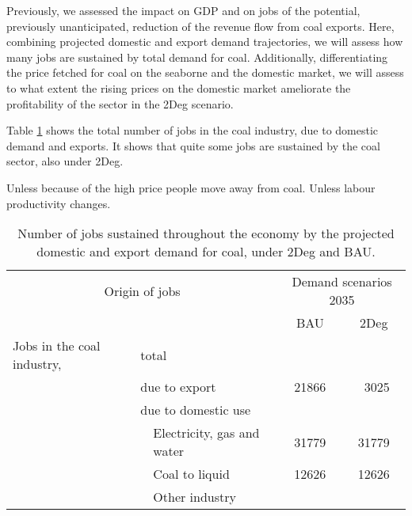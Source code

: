 \documentclass[12pt,english]{article}
\begin{document}
Previously, we assessed the impact on GDP and on jobs of the potential, previously unanticipated, reduction of the revenue flow from coal exports. Here, combining projected domestic and export demand trajectories, we will assess how many jobs are sustained by total demand for coal. Additionally, differentiating the price fetched for coal on the seaborne and the domestic market, we will assess to what extent the rising prices on the domestic market ameliorate the profitability of the sector in the 2Deg scenario. 

Table \ref{coalExport_BAUvs2Deg_2035} shows the total number of jobs in the coal industry, due to domestic demand and exports. It shows that quite some jobs are sustained by the coal sector, also under 2Deg. 

Unless because of the high price people move away from coal. Unless labour productivity changes.


\begin{table}[ht]
	\centering
	\begin{tabular}{lp{20pt}lcc}
		\multicolumn{3}{c}{Origin of jobs} &\multicolumn{2}{c}{Demand scenarios 2035}   \\ 
		\multicolumn{3}{c}{} & BAU & 2Deg \\ 
		\midrule
		Jobs in the coal industry,	& \multicolumn{2}{l}{total}  &  &  \\ 
		& \multicolumn{2}{l}{due to export}  	   & 21866 & \ 3025  \\ 
		& \multicolumn{2}{l}{due to domestic use}  &  &  \\ 
		& 	 & Electricity, gas and water 		   & 31779 & 31779  \\ 
		&    & Coal to liquid & 12626  & 12626 \\ 
		&    & Other industry &   &   \\ 														
		\bottomrule
	\end{tabular}
	\caption{\label{coalExport_BAUvs2Deg_2035}Number of jobs sustained throughout the economy by the projected domestic and export demand for coal, under 2Deg and BAU.}
\end{table}
\end{document}
